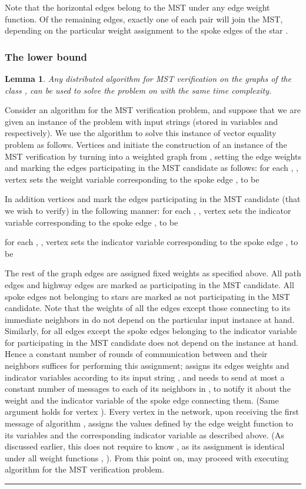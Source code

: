 \documentclass[11pt,letter]{article}
\newtheorem{lemma}[theorem]{Lemma}
\newcommand{\qed}{\rule{7pt}{7pt}}
\newenvironment{proof}{\noindent{\bf Proof}\hspace*{1em}}{\qed\bigskip}
\begin{document}
Note that the horizontal edges belong to the MST under any edge weight 
function. Of the remaining edges, exactly one of each pair will join the MST,
depending on the particular weight assignment to the spoke edges of
the star .

\subsubsection{The lower bound}

\begin{lemma}
\label{reduc2}
Any distributed algorithm for  MST verification on the graphs of the
class , can be used to solve the
 problem on  with the same
time complexity.
\end{lemma}

\begin{proof}
Consider an algorithm  for the MST verification problem, and 
suppose that we are given an instance of the 
problem with input strings  (stored in variables 
 and  respectively). We use the algorithm 
to solve this instance of vector equality problem as follows.
Vertices  and  initiate the construction of an
instance of the MST verification by turning  into a weighted graph from
, setting the edge weights and marking the edges participating in 
the MST candidate as follows:
for each , , vertex  sets the weight
variable  corresponding to the spoke edge ,
to be

In addition vertices  and  mark the edges participating in the MST 
candidate (that we wish to verify) in the following manner:  
for each , , vertex  sets 
the indicator variable  corresponding to the spoke edge 
,
to be

for each , , vertex  sets 
the indicator variable  corresponding to the spoke edge 
,
to be

The rest of the graph edges are assigned fixed weights as specified above.
All path edges and highway edges are marked 
as participating in the MST candidate. All spoke edges not belonging to stars 
 are marked as not participating in the MST candidate.  
Note that the weights of all the edges except those connecting  to its 
immediate neighbors in  do not depend on the particular input instance 
at hand. Similarly, for all edges except the spoke edges belonging to 
 the indicator variable for participating in the MST candidate 
does not depend on the instance at hand.  Hence a constant number of rounds
of communication between  and their   neighbors suffices 
for performing this assignment;  assigns its edges weights and indicator 
variables according to its input string , and needs to send at most 
a constant number of messages to each of its neighbors in , to notify it 
about the weight and the indicator variable of the spoke edge connecting them.
(Same argument holds for vertex ).
Every vertex  in the network,
upon receiving the first message of algorithm , assigns the
values defined by the edge weight function  to its
variables  and the corresponding indicator variable  
as described above.
(As discussed earlier, this does not require  to know , as
its assignment is identical under all weight functions ,
).
From this point on,  may proceed with executing algorithm
 for the MST verification problem.


\end{proof}
\end{document}
